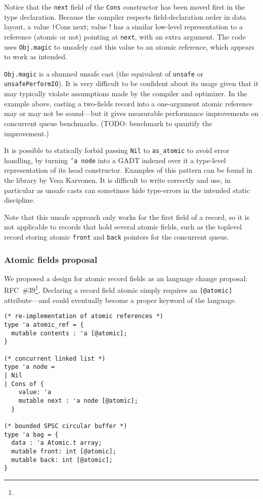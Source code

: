 Notice that the \texttt{next} field of the \texttt{Cons} constructor has been moved first in the type declaration.
Because the \OCaml compiler respects field-declaration order in data layout, a value \texttt!Cons { next; value }! has a similar low-level representation to a reference (atomic or not) pointing at \texttt{next}, with an extra argument.
The code uses \texttt{Obj.magic} to unsafely cast this value to an atomic reference, which appears to work as intended.

\texttt{Obj.magic} is a shunned unsafe cast (the \OCaml equivalent of \texttt{unsafe} or \texttt{unsafePerformIO}).
It is very difficult to be confident about its usage given that it may typically violate assumptions made by the \OCaml compiler and optimizer.
In the example above, casting a two-fields record into a one-argument atomic reference may or may not be sound---but it gives measurable performance improvements on concurrent queue benchmarks. (TODO: benchmark to quantify the improvement.)

It is possible to statically forbid passing \texttt{Nil} to \texttt{as_atomic} to avoid error handling, by turning \texttt{'a node} into a GADT indexed over it a type-level representation of its head constructor.
Examples of this pattern can be found in the \Kcas library by Vesa Karvonen.
It is difficult to write correctly and use, in particular as unsafe casts can sometimes hide type-errors in the intended static discipline.

Note that this unsafe approach only works for the first field of a record, so it is not applicable to records that hold several atomic fields, such as the toplevel record storing atomic \texttt{front} and \texttt{back} pointers for the concurrent queue.

\subsubsection{Atomic fields proposal}

We proposed a design for atomic record fields as an \OCaml language change proposal: RFC~\#39\footnote{}.
Declaring a record field atomic simply requires an \texttt{[@atomic]} attribute---and could eventually become a proper keyword of the language.

\begin{verbatim}
(* re-implementation of atomic references *)
type 'a atomic_ref = {
  mutable contents : 'a [@atomic];
}

(* concurrent linked list *)
type 'a node =
| Nil
| Cons of {
    value: 'a
    mutable next : 'a node [@atomic];
  }

(* bounded SPSC circular buffer *)
type 'a bag = {
  data : 'a Atomic.t array;
  mutable front: int [@atomic];
  mutable back: int [@atomic];
}
\end{verbatim}

